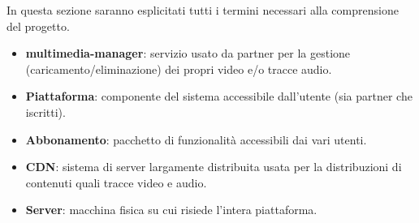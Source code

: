  In questa sezione saranno esplicitati tutti i termini necessari alla comprensione del progetto.

\begin{itemize}
	\item  \textbf{multimedia-manager}: servizio usato da partner per la gestione (caricamento/eliminazione) dei propri video e/o tracce audio.
	
	\item \textbf{Piattaforma}: componente del sistema accessibile dall'utente (sia partner che iscritti).
	\item \textbf{Abbonamento}: pacchetto di funzionalità accessibili dai vari utenti.
	\item \textbf{CDN}: sistema di server largamente distribuita usata per la distribuzioni di contenuti quali tracce video e audio.
	\item \textbf{Server}: macchina fisica su cui risiede l'intera piattaforma.
\end{itemize}